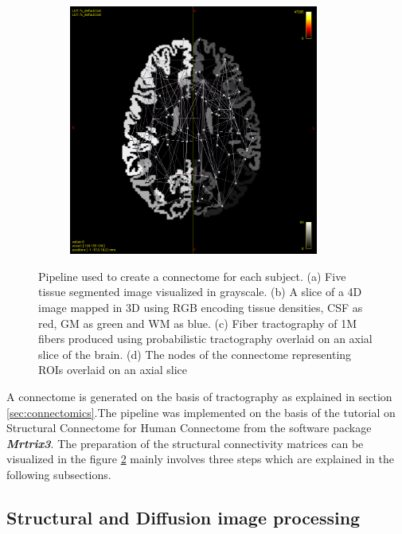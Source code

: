 \documentclass[msthesis.tex]{subfiles}
\begin{document}
\begin{figure}
\begin{subfigure}[b]{0.4\textwidth}
         \includegraphics[height=0.9\textwidth,width=0.9\textwidth]{images/connectome.png}
         \caption{}
         \label{fig:1M_tract}
     \end{subfigure}
     \fi
 
    \caption{Pipeline used to create a connectome for each subject. (a) Five tissue segmented image visualized in grayscale. (b) A slice of a 4D image mapped in 3D using RGB encoding tissue densities, CSF as red, GM as green and WM as blue. (c) Fiber tractography of 1M fibers produced using probabilistic tractography overlaid on an axial slice of the brain. (d) The nodes of the connectome representing ROIs overlaid on an axial slice}
    \label{fig:preproc}
\end{figure}
A connectome is generated on the basis of tractography as explained in section \ref{sec:connectomics}.The pipeline was implemented on the basis of the tutorial on Structural Connectome for Human Connectome from the software package \textbf{\textit{Mrtrix3}}. The preparation of the structural connectivity matrices can be visualized in the figure \ref{fig:preproc} mainly involves three steps which are explained in the following subsections.

\subsection{Structural  and Diffusion image processing}
\label{subsec:struct_diff}
\end{document}
